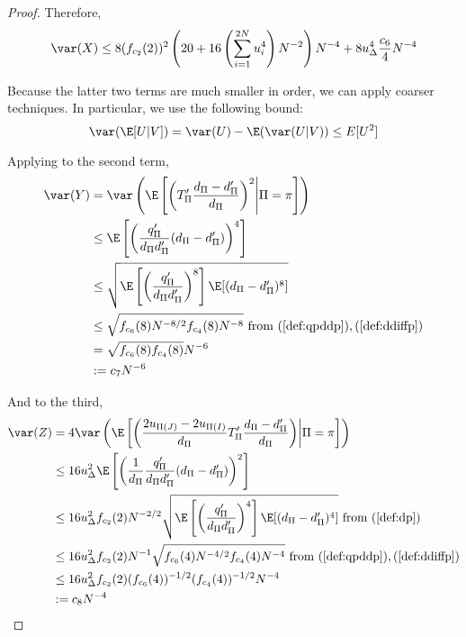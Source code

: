 \begin{proof}
  Therefore, 
  \begin{equation*}
    \var(X) \leq 8(f_{c_2}(2))^2 \left ( 20 + 16 \left ( \sum_{i=1}^{2N} u_{i}^4 \right )N^{-2}
    \right ) N^{-4} 
    + 8u_{\Delta}^4 \frac{c_6}{4} N^{-4}    
  \end{equation*}
  
  Because the latter two terms are much smaller in order, we can apply
  coarser techniques.  In particular, we use the following bound:
  \begin{equation*}
    \var (\E[U|V]) = \var(U) - \E (\var (U|V)) \leq E[U^2]
  \end{equation*}

  Applying to the second term,
  \begin{align*}
    \var(Y) &= \var \left ( \E \left [ \left ( T'_{\Pi}\frac{d_{\Pi}-d_{\Pi}'}{d_{\Pi}} \right )^2
        \middle | \Pi = \pi \right ] \right ) \\
    &\leq \E \left [ \left ( \frac{q_{\Pi}'}{d_{\Pi}d_{\Pi}'} (d_{\Pi}-d_{\Pi}') \right )^4 \right ] \\
    &\leq \sqrt{\E \left [ \left ( \frac{q_{\Pi}'}{d_{\Pi}d_{\Pi}'} \right )^8 \right ]
      \E [(d_{\Pi}-d_{\Pi}')^8]} \\
    &\leq \sqrt{f_{c_6}(8) N^{-8/2} f_{c_4}(8) N^{-8}} \text{ from }
    (\ref{def:qpddp}),(\ref{def:ddiffp}) \\
    &= \sqrt{f_{c_6}(8)f_{c_4}(8)}N^{-6} \\
    &:= c_7 N^{-6}
  \end{align*}

  And to the third,
  \begin{align*}
    \var(Z) &= 4 \var \left ( \E \left [ \left ( \frac{2u_{\Pi(J)}-2u_{\Pi(I)}}{d_{\Pi}}
          T_{\Pi}'\frac{d_{\Pi}-d_{\Pi}'}{d_{\Pi}} \right ) \middle | \Pi = \pi \right ] \right ) \\
    &\leq 16 u_{\Delta}^2 \E \left [ \left ( \frac{1}{d_{\Pi}} \frac{q_{\Pi}'}{d_{\Pi}d_{\Pi}'}
        (d_{\Pi}-d_{\Pi}') \right )^2 \right ] \\
    &\leq 16 u_{\Delta}^2 f_{c_2}(2) N^{-2/2} \sqrt{\E \left [ \left (
          \frac{q_{\Pi}'}{d_{\Pi}d_{\Pi}'} \right )^4 \right ] \E[(d_{\Pi}-d_{\Pi}')^4]
    } \text{ from } (\ref{def:dp}) \\
    &\leq 16 u_{\Delta}^2 f_{c_2}(2) N^{-1} \sqrt{f_{c_6}(4) N^{-4/2} f_{c_4}(4) N^{-4}}
    \text{ from } (\ref{def:qpddp}),(\ref{def:ddiffp}) \\
    &\leq 16 u_{\Delta}^2 f_{c_2}(2) (f_{c_6}(4))^{-1/2} (f_{c_4}(4))^{-1/2} N^{-4} \\
    &:= c_8 N^{-4}
  \end{align*}


\end{proof}
